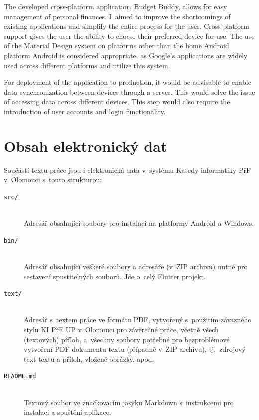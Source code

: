 \documentclass[
  biblatex,
  figures=true,
  tables=false,
  glossaries,
  index
]{kidiplom}
\begin{document}
\begin{kiconclusions}[english]
The developed cross-platform application, Budget Buddy, allows for easy management of personal finances. I~aimed to improve the shortcomings of existing applications and simplify the entire process for the user. Cross-platform support gives the user the ability to choose their preferred device for use. The use of the Material Design system on platforms other than the home Android platform Android is considered appropriate, as Google’s applications are widely used across different platforms and utilize this system.

For deployment of the application to production, it would be advisable to enable data synchronization between devices through a server. This would solve the issue of accessing data across different devices. This step would also require the introduction of user accounts and login functionality.
\end{kiconclusions}

\appendix
\section{Obsah elektronický dat} \label{sec:ObsahElData}
Součástí textu práce jsou i elektronická data v~systému Katedy informatiky PřF v~Olomouci s~touto strukturou:

\begin{description}

  \item[\texttt{src/}] \hfill \\
    Adresář obsahující soubory pro instalaci na platformy Android a Windows.
  \item[\texttt{bin/}] \hfill \\
    Adresář obsahující veškeré soubory a adresáře (v~ZIP archivu) nutné pro sestavení spustitelných souborů. Jde o~celý Flutter projekt.
  \item[\texttt{text/}] \hfill \\
    Adresář s~textem práce ve formátu PDF, vytvořený s~použitím
    závazného stylu KI PřF UP v~Olomouci pro závěrečné práce, včetně
    všech (textových) příloh, a~všechny soubory potřebné pro
    bezproblémové vytvoření PDF dokumentu textu (případně v~ZIP
    archivu), tj.~zdrojový text textu a příloh, vložené obrázky, apod.
  \item[\texttt{README.md}] \hfill \\
    Textový soubor ve značkovacím jazyku Markdown s~instrukcemi pro instalaci a spuštění aplikace.

\end{description}
\end{document}
